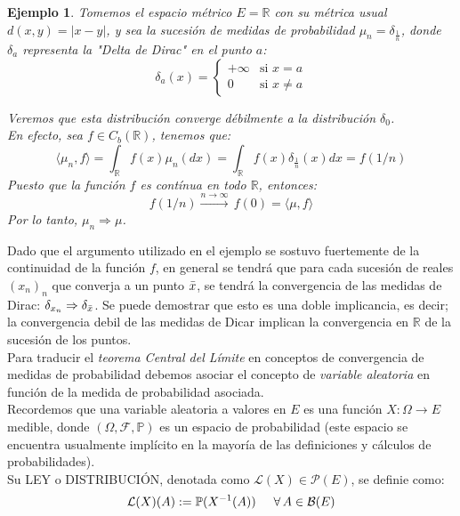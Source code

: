 \documentclass[a4paper]{article}
\newtheorem{ejemplo}{Ejemplo}
\numberwithin{equation}{subsection}
\def\R{\mathbb R}
\newcommand{\pb}{\mathbb{P}}
\begin{document}
\begin{ejemplo}
    Tomemos el espacio métrico $E=\R$ con su métrica usual $d(x,y) = |x-y|$, y sea la sucesión de medidas de probabilidad $\mu_n = \delta_{\frac{1}{n}}$, donde $\delta_a$ representa la "Delta de Dirac" en el punto $a$:
    \[\delta_a(x) = \begin{cases} 
            +\infty & \text{si }x=a   \\ 
            0 & \text{si }x\neq a \end{cases}\]
    
    Veremos que esta distribución converge débilmente a la distribución $\delta_0$.\\ \newline
    En efecto, sea $f \in C_b(\R)$, tenemos que:
    \[\langle \mu_n ,f\rangle = \int_\R f(x) \mu_n (dx) = \int_\R f(x) \delta_{\frac{1}{n}}(x) dx = f(1/n)\]
    Puesto que la función $f$ es contínua en todo $\R$, entonces:
    \[f(1/n) \xrightarrow{n\rightarrow\infty}\,f(0) = \langle \mu,f\rangle \]
    Por lo tanto, $\mu_n \Rightarrow \mu$.
\end{ejemplo}
Dado que el argumento utilizado en el ejemplo se sostuvo fuertemente de la continuidad de la función $f$, en general se tendrá que para cada sucesión de reales $(x_n)_n$ que converja a un punto $\Bar{x}$, se tendrá la convergencia de las medidas de Dirac: $\delta_{x_n}\Rightarrow \delta_{\Bar{x}}$. Se puede demostrar que esto es una doble implicancia, es decir; la convergencia debil de las medidas de Dicar implican la convergencia en $\R$ de la sucesión de los puntos.\\ \newline
Para traducir el \textit{teorema Central del Límite} en conceptos de convergencia de medidas de probabilidad debemos asociar el concepto de \textit{variable aleatoria} en función de la medida de probabilidad asociada.\\
Recordemos que una variable aleatoria a valores en $E$ es una función $X:\Omega \rightarrow E$ medible, donde $(\Omega, \mathcal{F},\pb)$ es un espacio de probabilidad (este espacio se encuentra usualmente implícito en la mayoría de las definiciones y cálculos de probabilidades).\\ Su LEY o DISTRIBUCIÓN, denotada como $\mathcal{L}(X) \in \mathcal{P}(E)$, se definie como:
\begin{equation}
   \mathcal{L}(X)(A) := \pb(X^{-1}(A))\hspace{0.5cm}\forall\,A\in\mathcal{B}(E) 
\end{equation}
\end{document}
